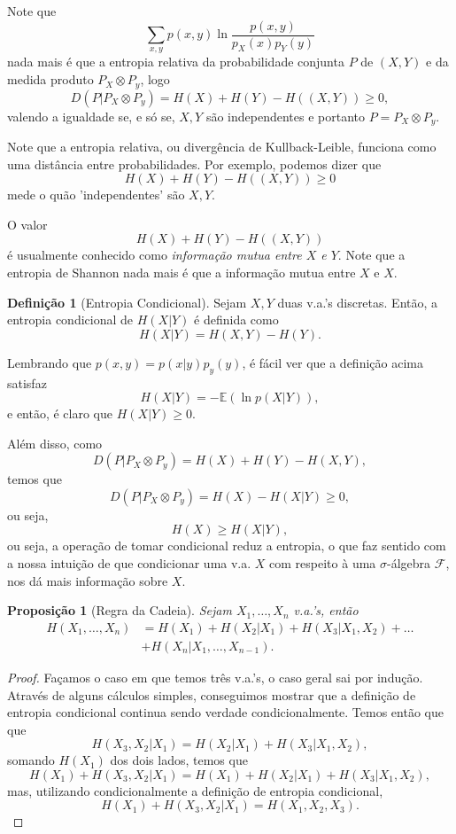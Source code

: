 \documentclass[12pt,a4paper,oneside]{book}
\newtheorem{proposition}[theorem]{Proposi\c{c}\~ao}
\theoremstyle{definition}
\newtheorem{definition}[theorem]{Defini\c{c}\~ao}
\theoremstyle{remark}
\numberwithin{equation}{section}
\newcommand{\E}{\mathbb{E}}
\begin{document}
Note que
$$\sum_{x,y} p(x,y) \ln \dfrac{p(x,y)}{p_X(x)p_Y(y)} $$
nada mais é que a entropia relativa da probabilidade conjunta $P$ de $(X,Y)$ e da medida produto $P_X\otimes P_y$, logo 
$$ D(P|P_X\otimes P_y) = H(X) + H(Y) - H( (X,Y) )  \geq 0, $$
valendo a igualdade se, e só se, $X,Y$ são independentes e portanto $P=P_X\otimes P_y$.

\begin{tcolorbox}[colback = yellow!60]
Note que a entropia relativa, ou divergência de Kullback-Leible, funciona como uma distância entre probabilidades. Por exemplo, podemos dizer que  
$$H(X) + H(Y) - H( (X,Y) )\geq 0 $$
mede o quão 'independentes' são $X,Y$.

O valor
$$ H(X) + H(Y) - H( (X,Y) )$$ 
é usualmente conhecido como \emph{informação mutua entre $X$ e $Y$}. Note que a entropia de Shannon nada mais é que a informação mutua entre $X$ e $X$. 
\end{tcolorbox}

\begin{definition}[Entropia Condicional] Sejam $X,Y$ duas v.a.'s discretas. Então,
a entropia condicional de $H(X|Y)$  é definida como
$$H(X|Y) = H(X,Y)-H(Y). $$
\end{definition}

Lembrando que $p(x,y) = p(x|y)p_y(y)$, é fácil ver que a definição acima  satisfaz
$$H(X|Y)  = -\E(\ln p(X|Y)),$$
e então, é claro que $H(X|Y)\geq 0.$

Além disso, como 
$$ D(P|P_X\otimes P_y) = H(X) + H(Y) - H( X,Y ), $$
temos que 
$$ D(P|P_X\otimes P_y) = H(X)  - H( X|Y )  \geq 0, $$
ou seja,
$$H(X)\geq H(X|Y), $$
ou seja, a operação de tomar condicional reduz a entropia, o que faz sentido com a nossa intuição de que  condicionar uma v.a. $X$ com respeito à uma $\sigma$-álgebra $\mathcal{F}$, nos dá mais informação sobre $X$.

\begin{proposition}[Regra da Cadeia] Sejam $X_1,\dots,X_n$ v.a.'s, então
\begin{align*}
H(X_1,\dots,X_n) &= H(X_1)+H(X_2|X_1) + H(X_3|X_1,X_2)+\dots\\
&+ H(X_n|X_1,\dots,X_{n-1}). 
\end{align*}
\end{proposition}
\begin{proof}
Façamos o caso em que temos três v.a.'s, o caso geral sai por indução. Através de alguns cálculos simples, conseguimos mostrar que a definição de entropia condicional continua sendo verdade condicionalmente. Temos então que que
$$H(X_3,X_2|X_1) =H(X_2|X_1)+H(X_3|X_1,X_2), $$
somando $H(X_1)$ dos dois lados, temos que
$$H(X_1) + H(X_3,X_2|X_1) = H(X_1)+H(X_2|X_1)+H(X_3|X_1,X_2), $$
mas, utilizando condicionalmente a  definição de entropia condicional,
$$H(X_1) + H(X_3,X_2|X_1) = H(X_1,X_2,X_3). $$
\end{proof}
\end{document}
